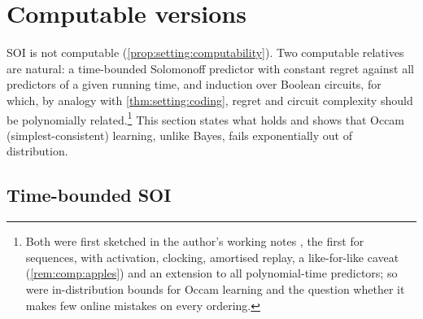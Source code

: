 \section{Computable versions}\label{sec:comp}

SOI is not computable (\cref{prop:setting:computability}). Two computable relatives are natural: a time-bounded Solomonoff predictor with constant regret against all predictors of a given running time, and induction over Boolean circuits, for which, by analogy with \cref{thm:setting:coding}, regret and circuit complexity should be polynomially related.\footnote{Both were first sketched in the author's working notes \citep{hanni2026notes}, the first for sequences, with activation, clocking, amortised replay, a like-for-like caveat (\cref{rem:comp:apples}) and an extension to all polynomial-time predictors; so were in-distribution bounds for Occam learning and the question whether it makes few online mistakes on every ordering.} This section states what holds and shows that Occam (simplest-consistent) learning, unlike Bayes, fails exponentially out of distribution.

\subsection{Time-bounded SOI}\label{sec:comp:time}

